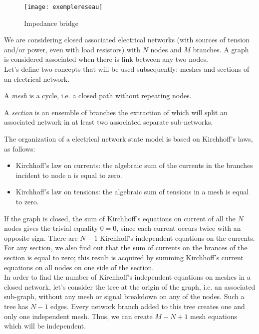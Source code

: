 \begin{figure}[t]
\begin{center}
\texttt{[image: exemplereseau]}
\caption{Impedance bridge}
\label{fig:exemplereseau}
\end{center}
\end{figure}
We are considering closed associated electrical networks (with sources of tension and/or power, even with load resistors) with $N$ nodes and $M$ branches.  A graph is considered associated when there is link between any two nodes.\\

Let’s define two concepts that will be used subsequently:  meshes and sections of an electrical network.

\begin{description}
\item A {\em mesh} is a cycle, i.e. a closed path without repeating nodes.
\item A {\em section} is an ensemble of branches the extraction of which will split an associated network in at least two associated separate sub-networks.
\end{description}

The organization of a electrical network state model is based on Kirchhoff’s laws, as follows:
\begin{itemize}
\item Kirchhoff’s law on currents:  the algebraic sum of the currents in the branches incident to node a is equal to zero.
\item Kirchhoff’s law on tensions:  the algebraic sum of tensions in a mesh is equal to zero.
\end{itemize}

If the graph is closed, the sum of Kirchhoff’s equations on current of all the $N$ nodes gives the trivial equality $0 = 0$, since each current occurs twice with an opposite sign.  There are $N-1$ Kirchhoff’s independent equations on the currents.  For any section, we also find out that the sum of currents on the brances of the section is equal to zero;  this result is acquired by summing Kirchhoff’s current equations on all nodes on one side of the section.\\

In order to find the number of Kirchhoff’s independent equations on meshes in a closed network, let’s consider the tree at the origin of the graph, i.e. an associated sub-graph, without any mesh or signal breakdown on any of the nodes.  Such a tree has $N - 1$ edges.  Every network branch added to this tree creates one and only one independent mesh.  Thus, we can create $M-N + 1$ mesh equations which will be independent.

